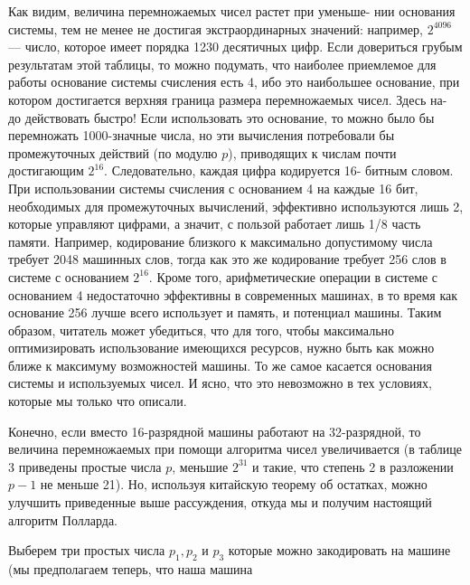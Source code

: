 \documentclass{mai_book}
\begin{document}
Как видим, величина перемножаемых чисел растет при уменьше-\linebreak
нии основания системы, тем не менее не достигая экстраординарных\linebreak
значений: например, $2^{4096}$ --- число, которое имеет порядка 1230 десятичных цифр. Если довериться грубым результатам этой таблицы, то \linebreak
можно подумать, что наиболее приемлемое для работы основание системы счисления есть 4, ибо это наибольшее основание, при котором достигается верхняя граница размера перемножаемых чисел. Здесь на- \linebreak
\pagebreak
\newpage
\hspace{-14pt}до действовать быстро! Если использовать это основание, то можно
было бы перемножать 1000-значные числа, но эти вычисления 
потребовали бы промежуточных действий (по модулю $p$), приводящих к числам
почти достигающим $2^{16}$. Следовательно, каждая цифра кодируется 16-
битным словом. При использовании системы счисления с основанием
4 на каждые 16 бит, необходимых для промежуточных вычислений,
эффективно используются лишь 2, которые управляют цифрами, а 
значит, с пользой работает лишь 1/8 часть памяти. Например, 
кодирование близкого к максимально допустимому числа требует 2048 
машинных слов, тогда как это же кодирование требует 256 слов в системе
с основанием $2^{16}$. Кроме того, арифметические операции в системе с
основанием 4 недостаточно эффективны в современных машинах, в то
время как основание 256 лучше всего использует и память, и потенциал
машины. Таким образом, читатель может убедиться, что для того, 
чтобы максимально оптимизировать использование имеющихся ресурсов,
нужно быть как можно ближе к максимуму возможностей машины. То
же самое касается основания системы и используемых чисел. И ясно,
что это невозможно в тех условиях, которые мы только что описали.\par
  Конечно, если вместо 16-разрядной машины работают на 
32-разрядной, то величина перемножаемых при помощи алгоритма чисел 
увеличивается (в таблице 3 приведены простые числа $p$, меньшие $2^{31}$ и
такие, что степень 2 в разложении $p - 1$ не меньше 21). Но, используя
китайскую теорему об остатках, можно улучшить приведенные выше
рассуждения, откуда мы и получим настоящий алгоритм Полларда.\par
 Выберем три простых числа $p_{1}, p_{2}$ и $p_{3}$ которые можно 
закодировать на машине (мы предполагаем теперь, что наша машина 
\end{document}
